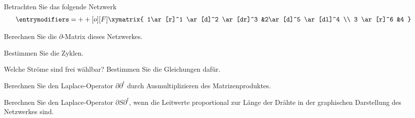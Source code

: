 Betrachten Sie das folgende Netzwerk
\[
\entrymodifiers={++[o][F]}
\xymatrix{
1\ar[r]^1 \ar[d]^2 \ar[dr]^3
	&2\ar[d]^5 \ar[dl]^4
\\
3 \ar[r]^6
	&4
}
\]
\begin{teilaufgaben}
\item Berechnen Sie die $\partial$-Matrix dieses Netzwerkes.
\item Bestimmen Sie die Zyklen.
\item Welche Ströme sind frei wählbar? Bestimmen Sie die Gleichungen dafür.
\item Berechnen Sie den Laplace-Operator $\partial\partial^t$ 
durch Ausmultiplizieren des Matrizenproduktes.
\item Berechnen Sie den Laplace-Operator $\partial S\partial^t$, wenn
die Leitwerte proportional zur Länge der Drähte in der graphischen
Darstellung des Netzwerkes sind.
\end{teilaufgaben}

